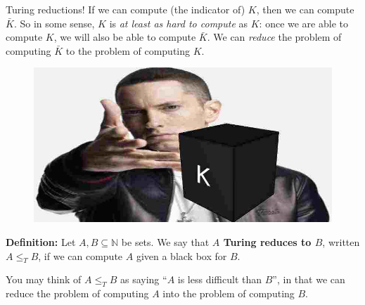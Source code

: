 \documentclass{beamer}
\newcommand{\N}{\mathbb N}
\begin{document}
\begin{frame}{Turing reductions!}
If we can compute (the indicator of) $K$, then we can compute $\bar{K}$. So in some sense, $K$ is \textit{at least as hard to compute} as $K$: once we are able to compute $K$, we will also be able to compute $\bar{K}$. We can \textit{reduce} the problem of computing $\bar{K}$ to the problem of computing $K$.

\begin{figure}[h]
    \centering
    \includegraphics[scale=0.2]{img/eminem.jpg}
\end{figure}

\pause

\textbf{Definition:} Let $A, B \subseteq \N$ be sets. We say that \textbf{$A$ Turing reduces to $B$}, written $A \leq_T B$, if we can compute $A$ given a black box for $B$.

\vspace{2mm}

\pause

You may think of $A \leq_T B$ as saying ``$A$ is less difficult than $B$'', in that we can reduce the problem of computing $A$ into the problem of computing $B$.

\end{frame}
\end{document}
